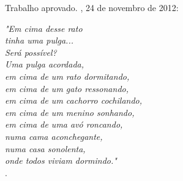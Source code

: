 \begin{folhadeaprovacao}
	\begin{center}
	  {\ABNTEXchapterfont\large\imprimirautor}
	  \vspace*{\fill}\vspace*{\fill}
	  \begin{center}
		\ABNTEXchapterfont\bfseries\Large\imprimirtitulo
	  \end{center}
	  \vspace*{\fill}
	  \hspace{.45\textwidth}
	  \begin{minipage}{.5\textwidth}
		  \imprimirpreambulo
	  \end{minipage}%
	  \vspace*{\fill}
	 \end{center}
		  
	 Trabalho aprovado. \imprimirlocal, 24 de novembro de 2012:
  
		
	 \begin{center}
	  \vspace*{0.5cm}
	  {\large\imprimirlocal}
	  \par
	  {\large\imprimirdata}
	  \vspace*{1cm}
	\end{center}
	
\end{folhadeaprovacao}
\begin{epigrafe}
	\vspace*{\fill}
	\begin{flushright}
        \textit{"Em cima desse rato\\
        tinha uma pulga...\\
        Será possível?\\
        Uma pulga acordada,\\
        em cima de um rato dormitando,\\
        em cima de um gato ressonando,\\
        em cima de um cachorro cochilando,\\
        em cima de um menino sonhando,\\
        em cima de uma avó roncando,\\
        numa cama aconchegante,\\
        numa casa sonolenta,\\
        onde todos viviam dormindo."\\}
        \cite{casasonolenta}.
	\end{flushright}
\end{epigrafe}
